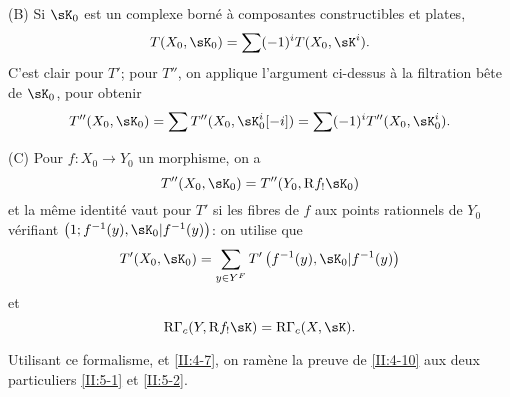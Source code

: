 (B) Si $\sK_0$ est un complexe borné à composantes constructibles et plates, 
\[
  T(X_0,\sK_0) = \sum (-1)^i T(X_0,\sK^i) \text{.}
\]
C'est clair pour $T'$; pour $T''$, on applique l'argument ci-dessus à la 
filtration bête de $\sK_0$, pour obtenir 
\[
  T''(X_0,\sK_0) = \sum T''(X_0,\sK_0^i[-i]) = \sum (-1)^i T''(X_0,\sK_0^i) \text{.}
\]

(C) Pour $f:X_0\to Y_0$ un morphisme, on a 
\[
  T''(X_0,\sK_0) = T''(Y_0,\eR f_! \sK_0)
\]
et la même identité vaut pour $T'$ si les fibres de $f$ aux points 
rationnels de $Y_0$ vérifiant $\left(1;f^{-1}(y),\sK_0|f^{-1}(y)\right)$: on 
utilise que 
\[
  T'(X_0,\sK_0) = \sum_{y\in Y^F} T'\left(f^{-1}(y), \sK_0|f^{-1}(y)\right)
\]
et 
\[
  \eR\Gamma_c(Y, \eR f_! \sK) = \eR\Gamma_c(X,\sK) \text{.}
\]

Utilisant ce formalisme, et \ref{II:4-7}, on ramène la preuve de \ref{II:4-10} 
aux deux particuliers \ref{II:5-1} et \ref{II:5-2}. 

